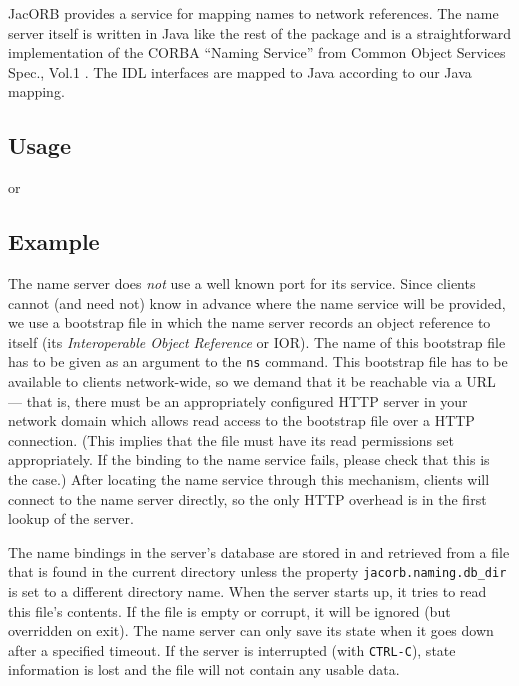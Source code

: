 \documentclass[12pt]{scrbook}
\begin{document}
JacORB provides a service for mapping names to network references. The
name server itself is written in Java like the rest of the package and
is a  straightforward implementation  of the CORBA  ``Naming Service''
from  Common  Object Services  Spec.,  Vol.1  \cite{OMG1997}. The  IDL
interfaces are mapped to Java according to our Java mapping.

\subsection*{Usage}


or 


\subsection*{Example}


The name server does {\it not}  use a well known port for its service.
Since clients  cannot (and  need not) know  in advance where  the name
service will  be provided, we use  a bootstrap file in  which the name
server records  an object reference to itself  (its {\it Interoperable
Object Reference} or  IOR). The name of this bootstrap  file has to be
given as an argument to the  {\tt ns} command. This bootstrap file has
to  be available  to clients  network-wide, so  we demand  that  it be
reachable  via a  URL  --- that  is,  there must  be an  appropriately
configured HTTP server in your network domain which allows read access
to the bootstrap  file over a HTTP connection.  (This implies that the
file must have its read  permissions set appropriately. If the binding
to the name service fails, please  check that this is the case.) After
locating the name service through this mechanism, clients will connect
to the name server directly, so the only HTTP overhead is in the first
lookup of the server.

The name bindings in the server's database are stored in and retrieved
from a file that is found in the current directory unless the property
{\tt jacorb.naming.db\_dir} is set to a different directory name. When
the server  starts up, it tries  to read this file's  contents. If the
file  is  empty or  corrupt,  it will  be  ignored  (but overridden  on
exit). The name server can only save its state when it goes down after
a specified timeout. If the server is interrupted (with {\tt CTRL-C}),
state information  is lost  and the file  will not contain  any usable
data.
\end{document}
